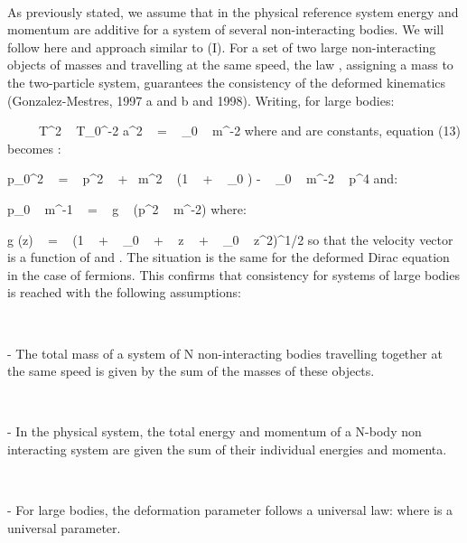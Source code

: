 \documentclass[a4paper,12pt,dvips]{article}
\begin{document}
~

As previously stated, we assume that in the physical reference system energy and momentum are additive for a system of several non-interacting bodies. We will follow here and approach similar to (I). For a set of two large non-interacting objects of masses \coordHE{} and \coordHE{} travelling at the same speed, the law \coordHE{}, assigning a mass \coordHE{} to the two-particle system, guarantees the consistency of the deformed kinematics (Gonzalez-Mestres, 1997 a and b and 1998). Writing, for large bodies:

\equation
\epsilon ~ \simeq ~ \lambda ~ T^2 ~ T_0^{-2} a^2 ~ = ~ \epsilon _0 ~ m^{-2}
\endequation
\noindent
where \myHighlight{$\lambda $}\coordHE{} and \coordHE{} are constants, equation (13) becomes : 

\equation
p_{0}^2 ~ = ~ p^2 ~ + ~m^2 ~ (1 ~ + ~ \epsilon _0 ) - ~ \epsilon _0 ~ m^{-2} ~ p^4
\endequation
\noindent
and:

\equation
p_0 ~ m^{-1} ~ = ~ g ~ (p^2 ~ m^{-2})
\endequation
\noindent
where:

\equation
g (z) ~ = ~ (1 ~ + ~ \epsilon _0 ~ + ~ z ~ + ~ \epsilon _0 ~ z^2)^{1/2}
\endequation
\noindent
so that the velocity vector \coordHE{} is a function of \coordHE{} and \coordHE{}. The situation is the same for the deformed Dirac equation in the case of fermions. This confirms that consistency for systems of large bodies is reached with the following assumptions:

~ 

- The total mass of a system of N non-interacting bodies travelling together at the same speed is given by the sum of the masses of these objects.

~ 

- In the physical system, the total energy and momentum of a N-body non interacting system are given the sum of their individual energies and momenta.

~ 

- For large bodies, the deformation parameter \myHighlight{$\epsilon $}\coordHE{} follows a universal law: \coordHE{} where \coordHE{} is a universal parameter.

~
\end{document}
